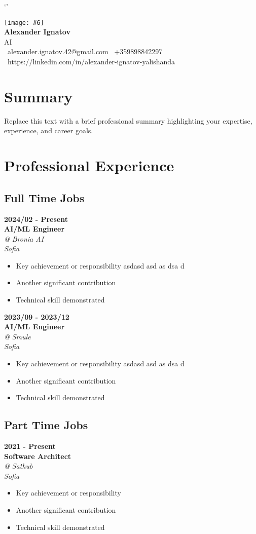 \documentclass[11pt,a4paper]{article}
\makeatletter
\newcommand{\cvheader}[6]{
    \begin{center}
        \texttt{[image: \#6]} \\[4pt]
        {\Huge\textbf{#1}}\\[4pt]
        {\large #2}\\[2pt]
        \faEnvelope\ #3 \quad \faPhone\ #4 \\[2pt]
        \faLinkedin\ #5
    \end{center}
}
\newcommand{\workblock}[5]{
    \noindent \textbf{#1} \\
    \textbf{#2} \\
    \textit{@ #3} \\
    \textit{#4} \\
    #5
}
\makeatother
\begin{document}
`'
\cvheader{Alexander Ignatov}
         {AI}
         {alexander.ignatov.42@gmail.com}
         {+359898842297}
         {https://linkedin.com/in/alexander-ignatov-yalishanda}
         {az.jpg}

\section{Summary}
Replace this text with a brief professional summary highlighting your expertise, experience, and career goals.

\section{Professional Experience}
\begin{multicols}{3}
    \subsection{Full Time Jobs}
    \workblock{2024/02 - Present}{AI/ML Engineer}
    {Bronia AI}{Sofia}{
        \begin{itemize}
            \item Key achievement or responsibility asdasd asd as dsa d
            \item Another significant contribution
            \item Technical skill demonstrated
        \end{itemize}
    }

    \workblock{2023/09 - 2023/12}{AI/ML Engineer}
    {Smule}{Sofia}{
        \begin{itemize}
            \item Key achievement or responsibility asdasd asd as dsa d
            \item Another significant contribution
            \item Technical skill demonstrated
        \end{itemize}
    }
    
    \columnbreak
    
    \subsection{Part Time Jobs}
    \workblock{2021 - Present}{Software Architect}
    {Sathub}{Sofia}{
        \begin{itemize}
            \item Key achievement or responsibility
            \item Another significant contribution
            \item Technical skill demonstrated
        \end{itemize}
    }
    

\end{multicols}
\end{document}
